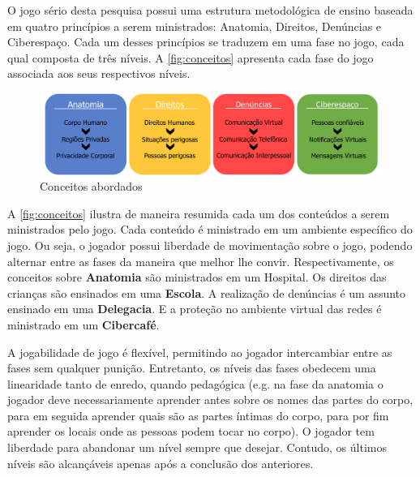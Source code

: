 
O jogo sério desta pesquisa possui uma estrutura metodológica de ensino baseada em quatro princípios a serem ministrados: Anatomia, Direitos, Denúncias e Ciberespaço. Cada um desses princípios se traduzem em uma fase no jogo, cada qual composta de três níveis. A \autoref{fig:conceitos} apresenta cada fase do jogo associada aos seus respectivos níveis.


\begin{figure}[hbt!]
  \caption{\label{fig:conceitos}Conceitos abordados}
  \begin{center}
    \includegraphics[width=\linewidth]{./Figuras/EsquemaFases.pdf}
    \end{center}
  
\end{figure}

A \autoref{fig:conceitos} ilustra de maneira resumida cada um dos conteúdos a serem ministrados pelo jogo. Cada conteúdo é ministrado em um ambiente específico do jogo. Ou seja, o jogador possui liberdade de movimentação sobre o jogo, podendo alternar entre as fases da maneira que melhor lhe convir. Respectivamente, os conceitos sobre \textbf{Anatomia} são ministrados em um Hospital. Os direitos das crianças são ensinados em uma \textbf{Escola}. A realização de denúncias é um assunto ensinado em uma \textbf{Delegacia}. E a proteção no ambiente virtual das redes é ministrado em um \textbf{Cibercafé}.

A jogabilidade de jogo é flexível, permitindo ao jogador intercambiar entre as fases sem qualquer punição. Entretanto, os níveis das fases obedecem uma linearidade tanto de enredo, quando pedagógica (e.g. na fase da anatomia o jogador deve necessariamente aprender antes sobre os nomes das partes do corpo, para em seguida aprender quais são as partes íntimas do corpo, para por fim aprender os locais onde as pessoas podem tocar no corpo). O jogador tem liberdade para abandonar um nível sempre que desejar. Contudo, os últimos níveis são alcançáveis apenas após a conclusão dos anteriores. 

